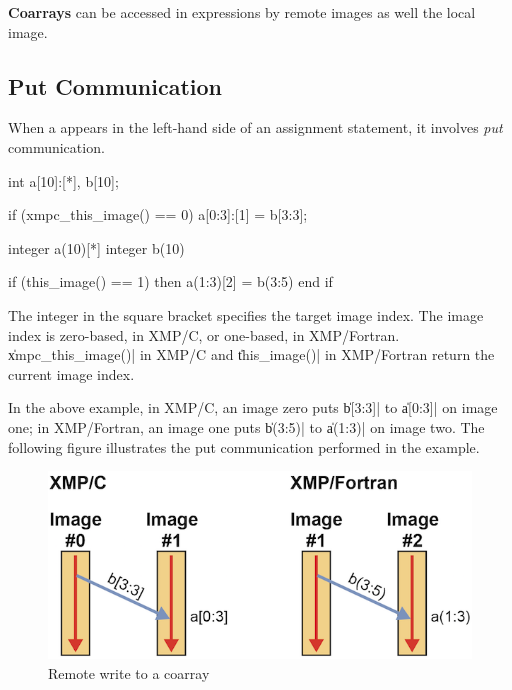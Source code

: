 {\bf Coarrays} can be accessed in expressions by remote images as well the
local image.


\subsection{Put Communication}

When a {\coarray} appears in the left-hand side of an
assignment statement, it involves {\it put} communication.

\begin{XCexample}
int a[10]:[*], b[10];

if (xmpc_this_image() == 0)
  a[0:3]:[1] = b[3:3];
\end{XCexample}

\begin{XFexample}
integer a(10)[*]
integer b(10)

if (this_image() == 1) then
  a(1:3)[2] = b(3:5)
end if
\end{XFexample}

The integer in the square bracket specifies the target image index. The
image index is zero-based, in XMP/C, or one-based, in
XMP/Fortran. \|xmpc_this_image()| in XMP/C and \|this_image()| in
XMP/Fortran return the current image index.



In the above example, in XMP/C, an image zero puts \|b[3:3]| to
\|a[0:3]| on image one; in XMP/Fortran, an image one puts \|b(3:5)| to
\|a(1:3)| on image two. The following figure illustrates the put
communication performed in the example.

\begin{figure}
  \centering
  \includegraphics[width=\textwidth]{figs/put.png}
  \caption{Remote write to a coarray}
\end{figure}

